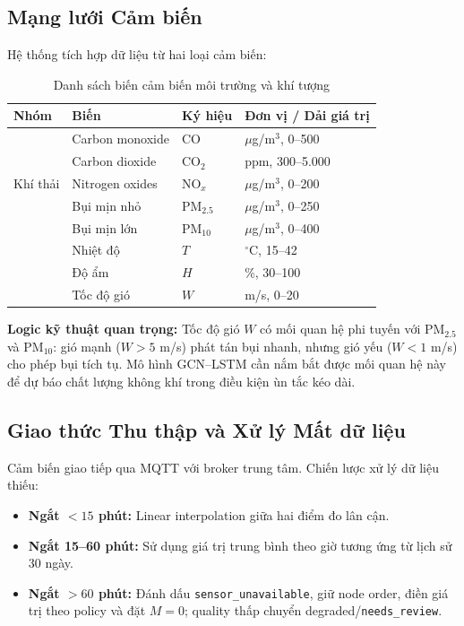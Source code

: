 \subsection{Mạng lưới Cảm biến}
Hệ thống tích hợp dữ liệu từ hai loại cảm biến:
\begin{table}[H]
\centering
\caption{Danh sách biến cảm biến môi trường và khí tượng}
\label{tab:sensors}
\renewcommand{\arraystretch}{1.4}
\begin{tabular}{p{2cm} p{3.2cm} p{2.5cm} p{4cm}}
\toprule
\textbf{Nhóm} & \textbf{Biến} & \textbf{Ký hiệu} & \textbf{Đơn vị / Dải giá trị} \\
\midrule
\multirow{5}{*}{Khí thải} & Carbon monoxide & CO & $\mu$g/m$^3$, 0--500 \\
  & Carbon dioxide & CO$_2$ & ppm, 300--5.000 \\
  & Nitrogen oxides & NO$_x$ & $\mu$g/m$^3$, 0--200 \\
  & Bụi mịn nhỏ & PM$_{2.5}$ & $\mu$g/m$^3$, 0--250 \\
  & Bụi mịn lớn & PM$_{10}$ & $\mu$g/m$^3$, 0--400 \\
\midrule
\rowcolor{rowgray}
\multirow{3}{*}{Khí tượng} & Nhiệt độ & $T$ & $^\circ$C, 15--42 \\
\rowcolor{rowgray}
  & Độ ẩm & $H$ & \%, 30--100 \\
\rowcolor{rowgray}
  & Tốc độ gió & $W$ & m/s, 0--20 \\
\bottomrule
\end{tabular}
\end{table}
\begin{tcolorbox}[tipbox]
\textbf{Logic kỹ thuật quan trọng:} Tốc độ gió $W$ có mối quan hệ phi tuyến với PM$_{2.5}$ và PM$_{10}$: gió mạnh ($W > 5$ m/s) phát tán bụi nhanh, nhưng gió yếu ($W < 1$ m/s) cho phép bụi tích tụ. Mô hình GCN--LSTM cần nắm bắt được mối quan hệ này để dự báo chất lượng không khí trong điều kiện ùn tắc kéo dài.
\end{tcolorbox}
\subsection{Giao thức Thu thập và Xử lý Mất dữ liệu}
Cảm biến giao tiếp qua MQTT với broker trung tâm. Chiến lược xử lý dữ liệu thiếu:
\begin{itemize}[leftmargin=1.5cm, itemsep=3pt]
  \item \textbf{Ngắt $< 15$ phút:} Linear interpolation giữa hai điểm đo lân cận.
  \item \textbf{Ngắt 15--60 phút:} Sử dụng giá trị trung bình theo giờ tương ứng từ lịch sử 30 ngày.
  \item \textbf{Ngắt $> 60$ phút:} Đánh dấu \texttt{sensor\_unavailable}, giữ node order, điền giá trị theo policy và đặt $M=0$; quality thấp chuyển degraded/\texttt{needs\_review}.
\end{itemize}
